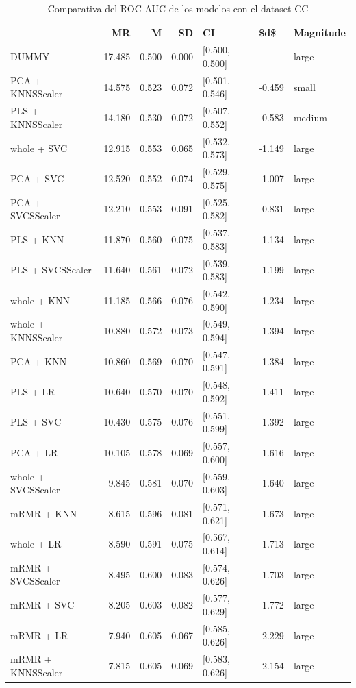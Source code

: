 \documentclass[a4paper,oneside,11pt,leqno]{article}
\begin{document}
	\begin{table}[h]
		\centering
		\begin{tabular}{lrrrlll}
			\toprule
			{} &     MR &     M &    SD &              CI &    \$d\$ & Magnitude \\
			\midrule
			DUMMY              & 17.485 & 0.500 & 0.000 &  [0.500, 0.500] &      - &     large \\
			PCA + KNNSScaler   & 14.575 & 0.523 & 0.072 &  [0.501, 0.546] & -0.459 &     small \\
			PLS + KNNSScaler   & 14.180 & 0.530 & 0.072 &  [0.507, 0.552] & -0.583 &    medium \\
			whole + SVC        & 12.915 & 0.553 & 0.065 &  [0.532, 0.573] & -1.149 &     large \\
			PCA + SVC          & 12.520 & 0.552 & 0.074 &  [0.529, 0.575] & -1.007 &     large \\
			PCA + SVCSScaler   & 12.210 & 0.553 & 0.091 &  [0.525, 0.582] & -0.831 &     large \\
			PLS + KNN          & 11.870 & 0.560 & 0.075 &  [0.537, 0.583] & -1.134 &     large \\
			PLS + SVCSScaler   & 11.640 & 0.561 & 0.072 &  [0.539, 0.583] & -1.199 &     large \\
			whole + KNN        & 11.185 & 0.566 & 0.076 &  [0.542, 0.590] & -1.234 &     large \\
			whole + KNNSScaler & 10.880 & 0.572 & 0.073 &  [0.549, 0.594] & -1.394 &     large \\
			PCA + KNN          & 10.860 & 0.569 & 0.070 &  [0.547, 0.591] & -1.384 &     large \\
			PLS + LR           & 10.640 & 0.570 & 0.070 &  [0.548, 0.592] & -1.411 &     large \\
			PLS + SVC          & 10.430 & 0.575 & 0.076 &  [0.551, 0.599] & -1.392 &     large \\
			PCA + LR           & 10.105 & 0.578 & 0.069 &  [0.557, 0.600] & -1.616 &     large \\
			whole + SVCSScaler &  9.845 & 0.581 & 0.070 &  [0.559, 0.603] & -1.640 &     large \\
			mRMR + KNN         &  8.615 & 0.596 & 0.081 &  [0.571, 0.621] & -1.673 &     large \\
			whole + LR         &  8.590 & 0.591 & 0.075 &  [0.567, 0.614] & -1.713 &     large \\
			mRMR + SVCSScaler  &  8.495 & 0.600 & 0.083 &  [0.574, 0.626] & -1.703 &     large \\
			mRMR + SVC         &  8.205 & 0.603 & 0.082 &  [0.577, 0.629] & -1.772 &     large \\
			mRMR + LR          &  7.940 & 0.605 & 0.067 &  [0.585, 0.626] & -2.229 &     large \\
			mRMR + KNNSScaler  &  7.815 & 0.605 & 0.069 &  [0.583, 0.626] & -2.154 &     large \\
			\bottomrule
		\end{tabular}
		\caption{Comparativa del ROC AUC de los modelos con el dataset CC}
		\label{tab:stat_results_cc}
	\end{table}
\end{document}
